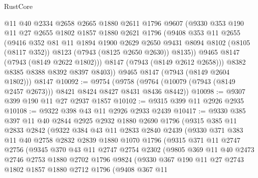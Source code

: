 \begin{lexlean}{RustCore}
\begin{coremodule}
            @11
            @40
            @2334
            @2658
            @2665
            @1880
            @2611
            @1796
            @9607
            (@9330
              @353
              @190
              @11
              @27
              @2655
              @1802
              @1857
              @1880
              @2621
              @1796
              (@9408
                @353
                @11
                @2655
                (@9416
                  @352
                  @81
                  @11
                  @1894
                  @1900
                  @2629
                  @2650
                  @9431
                  @8094
                  @8102
                  (@8105 (@8117 @352))
                  @8123
                  (@7943 (@8125 @2650 @2630))
                  @8135))
              @9465
              @8147
              (@7943 (@8149 @2622 @1802)))
            @8147
            (@7943 (@8149 @2612 @2658)))
          @8382
          @8385
          @8388
          @8392
          @8397
          @8403))
      @9465
      @8147
      (@7943 (@8149 @2604 @1802)))
    @8147
@10092 := @9754
    (@9758 (@9764 (@10079 (@7943 (@8149 @2457 @2673))) @8421 @8424 @8427 @8431 @8436 @8442))
@10098 := @9307 @399 @190 @11 @27 @2937 @1857
@10102 := @9315 @399 @11 @2926 @2935
@10108 := @9322 @398 @43 @11 @2926 @2933 @2439
@10417 := @9330
    @385
    @397
    @11
    @40
    @2844
    @2925
    @2932
    @1880
    @2690
    @1796
    (@9315
      @385
      @11
      @2833
      @2842
      (@9322
        @384
        @43
        @11
        @2833
        @2840
        @2439
        (@9330
          @371
          @383
          @11
          @40
          @2758
          @2832
          @2839
          @1880
          @1070
          @1796
          (@9315
            @371
            @11
            @2747
            @2756
            (@9345
              @370
              @43
              @11
              @2747
              @2754
              @2302
              (@9805
                @369
                @11
                @40
                @2473
                @2746
                @2753
                @1880
                @2702
                @1796
                @9824
                (@9330
                  @367
                  @190
                  @11
                  @27
                  @2743
                  @1802
                  @1857
                  @1880
                  @2712
                  @1796
                  (@9408
                    @367
                    @11

\end{coremodule}
\end{lexlean}
